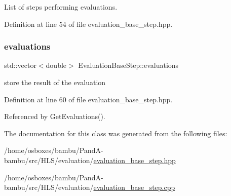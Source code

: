 List of steps performing evaluations. 



Definition at line 54 of file evaluation\+\_\+base\+\_\+step.\+hpp.

\mbox{\label{classEvaluationBaseStep_a00fc155f9398fd619dfc504d539231c7}} 
\subsubsection{\texorpdfstring{evaluations}{evaluations}}
{\footnotesize\ttfamily std\+::vector$<$double$>$ Evaluation\+Base\+Step\+::evaluations\hspace{0.3cm}{\ttfamily [protected]}}



store the result of the evaluation 



Definition at line 60 of file evaluation\+\_\+base\+\_\+step.\+hpp.



Referenced by Get\+Evaluations().



The documentation for this class was generated from the following files\+:\begin{DoxyCompactItemize}
\item 
/home/osboxes/bambu/\+Pand\+A-\/bambu/src/\+H\+L\+S/evaluation/\hyperlink{evaluation__base__step_8hpp}{evaluation\+\_\+base\+\_\+step.\+hpp}\item 
/home/osboxes/bambu/\+Pand\+A-\/bambu/src/\+H\+L\+S/evaluation/\hyperlink{evaluation__base__step_8cpp}{evaluation\+\_\+base\+\_\+step.\+cpp}\end{DoxyCompactItemize}
